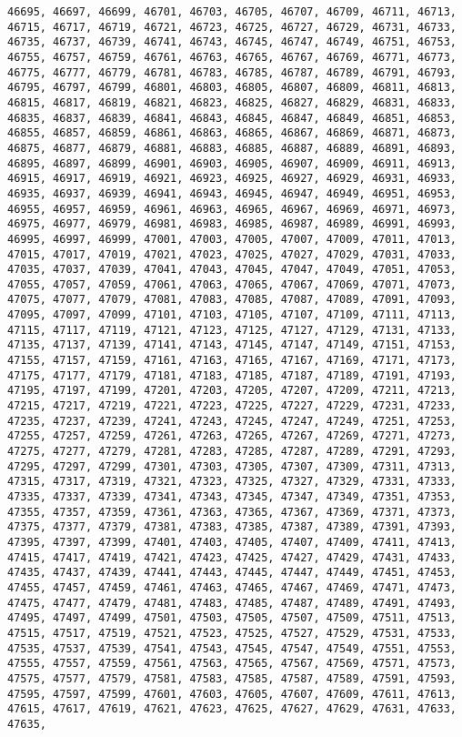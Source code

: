 \documentclass[11pt]{article}
\begin{document}
\begin{Verbatim}[commandchars=\\\{\}]
46695, 46697, 46699, 46701, 46703, 46705, 46707, 46709, 46711, 46713, 46715, 46717, 46719, 46721, 46723, 46725, 46727, 46729, 46731, 46733, 46735, 46737, 46739, 46741, 46743, 46745, 46747, 46749, 46751, 46753, 46755, 46757, 46759, 46761, 46763, 46765, 46767, 46769, 46771, 46773, 46775, 46777, 46779, 46781, 46783, 46785, 46787, 46789, 46791, 46793, 46795, 46797, 46799, 46801, 46803, 46805, 46807, 46809, 46811, 46813, 46815, 46817, 46819, 46821, 46823, 46825, 46827, 46829, 46831, 46833, 46835, 46837, 46839, 46841, 46843, 46845, 46847, 46849, 46851, 46853, 46855, 46857, 46859, 46861, 46863, 46865, 46867, 46869, 46871, 46873, 46875, 46877, 46879, 46881, 46883, 46885, 46887, 46889, 46891, 46893, 46895, 46897, 46899, 46901, 46903, 46905, 46907, 46909, 46911, 46913, 46915, 46917, 46919, 46921, 46923, 46925, 46927, 46929, 46931, 46933, 46935, 46937, 46939, 46941, 46943, 46945, 46947, 46949, 46951, 46953, 46955, 46957, 46959, 46961, 46963, 46965, 46967, 46969, 46971, 46973, 46975, 46977, 46979, 46981, 46983, 46985, 46987, 46989, 46991, 46993, 46995, 46997, 46999, 47001, 47003, 47005, 47007, 47009, 47011, 47013, 47015, 47017, 47019, 47021, 47023, 47025, 47027, 47029, 47031, 47033, 47035, 47037, 47039, 47041, 47043, 47045, 47047, 47049, 47051, 47053, 47055, 47057, 47059, 47061, 47063, 47065, 47067, 47069, 47071, 47073, 47075, 47077, 47079, 47081, 47083, 47085, 47087, 47089, 47091, 47093, 47095, 47097, 47099, 47101, 47103, 47105, 47107, 47109, 47111, 47113, 47115, 47117, 47119, 47121, 47123, 47125, 47127, 47129, 47131, 47133, 47135, 47137, 47139, 47141, 47143, 47145, 47147, 47149, 47151, 47153, 47155, 47157, 47159, 47161, 47163, 47165, 47167, 47169, 47171, 47173, 47175, 47177, 47179, 47181, 47183, 47185, 47187, 47189, 47191, 47193, 47195, 47197, 47199, 47201, 47203, 47205, 47207, 47209, 47211, 47213, 47215, 47217, 47219, 47221, 47223, 47225, 47227, 47229, 47231, 47233, 47235, 47237, 47239, 47241, 47243, 47245, 47247, 47249, 47251, 47253, 47255, 47257, 47259, 47261, 47263, 47265, 47267, 47269, 47271, 47273, 47275, 47277, 47279, 47281, 47283, 47285, 47287, 47289, 47291, 47293, 47295, 47297, 47299, 47301, 47303, 47305, 47307, 47309, 47311, 47313, 47315, 47317, 47319, 47321, 47323, 47325, 47327, 47329, 47331, 47333, 47335, 47337, 47339, 47341, 47343, 47345, 47347, 47349, 47351, 47353, 47355, 47357, 47359, 47361, 47363, 47365, 47367, 47369, 47371, 47373, 47375, 47377, 47379, 47381, 47383, 47385, 47387, 47389, 47391, 47393, 47395, 47397, 47399, 47401, 47403, 47405, 47407, 47409, 47411, 47413, 47415, 47417, 47419, 47421, 47423, 47425, 47427, 47429, 47431, 47433, 47435, 47437, 47439, 47441, 47443, 47445, 47447, 47449, 47451, 47453, 47455, 47457, 47459, 47461, 47463, 47465, 47467, 47469, 47471, 47473, 47475, 47477, 47479, 47481, 47483, 47485, 47487, 47489, 47491, 47493, 47495, 47497, 47499, 47501, 47503, 47505, 47507, 47509, 47511, 47513, 47515, 47517, 47519, 47521, 47523, 47525, 47527, 47529, 47531, 47533, 47535, 47537, 47539, 47541, 47543, 47545, 47547, 47549, 47551, 47553, 47555, 47557, 47559, 47561, 47563, 47565, 47567, 47569, 47571, 47573, 47575, 47577, 47579, 47581, 47583, 47585, 47587, 47589, 47591, 47593, 47595, 47597, 47599, 47601, 47603, 47605, 47607, 47609, 47611, 47613, 47615, 47617, 47619, 47621, 47623, 47625, 47627, 47629, 47631, 47633, 47635, 
\end{Verbatim}
\end{document}

